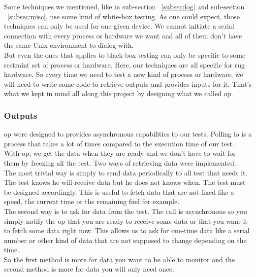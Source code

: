 \documentclass[12pt]{article}
\theoremstyle{definition}
\theoremstyle{definition}
\theoremstyle{remark}
\begin{document}
Some techniques we mentioned, like in sub-section ~\ref{subsec:log} and sub-section ~\ref{subsec:misc}, use some kind of white-box testing. As one could expect, those techniques can only be used for one given device. We cannot initiate a serial connection with every process or hardware we want and all of them don't have the same Unix environment to dialog with.\\

But even the ones that applies to black-box testing can only be specific to some restraint set of process or hardware. Here, our techniques are all specific for \gls{rug} hardware. So every time we need to test a new kind of process or hardware, we will need to write some code to retrieve outputs and provides inputs for it. That's what we kept in mind all along this project by designing what we called \gls{op}.\\

\subsubsection{Outputs}

\gls{op} were designed to provides asynchronous capabilities to our tests. Polling \gls{io} is a process that takes a lot of times compared to the execution time of our test. With \gls{op}, we get the data when they are ready and we don't have to wait for them by freezing all the test. Two ways of retrieving data were implemented.\\

The most trivial way is simply to send data periodically to all test that needs it. The test knows he will receive data but he does not knows when. The test must be designed accordingly. This is useful to fetch data that are not fixed like a speed, the current time or the remaining fuel for example.\\

The second way is to ask for data from the test. The call is asynchronous so you simply notify the \gls{op} that you are ready to receive some data or that you want it to fetch some data right now. This allows us to ask for one-time data like a serial number or other kind of data that are not supposed to change depending on the time.\\

So the first method is more for data you want to be able to monitor and the second method is more for data you will only need once.\\
\end{document}

